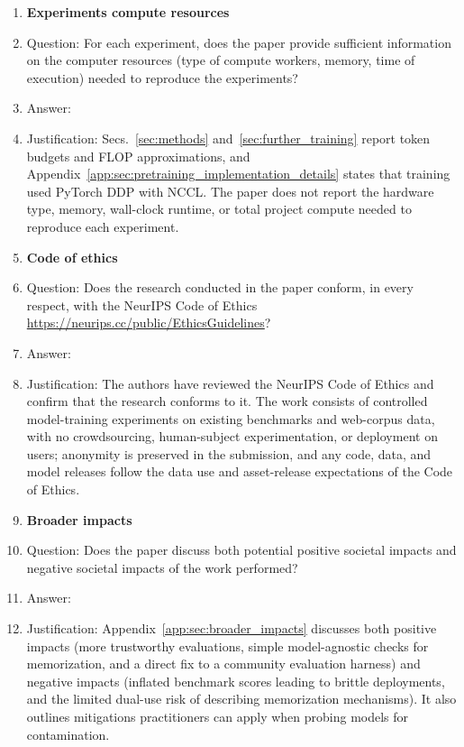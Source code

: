 \begin{enumerate}
\item {\bf Experiments compute resources}
    \item[] Question: For each experiment, does the paper provide sufficient information on the computer resources (type of compute workers, memory, time of execution) needed to reproduce the experiments?
    \item[] Answer: \answerNo{}
    \item[] Justification: Secs.~\ref{sec:methods} and~\ref{sec:further_training} report token budgets and FLOP approximations, and Appendix~\ref{app:sec:pretraining_implementation_details} states that training used PyTorch DDP with NCCL. The paper does not report the hardware type, memory, wall-clock runtime, or total project compute needed to reproduce each experiment.
    
\item {\bf Code of ethics}
    \item[] Question: Does the research conducted in the paper conform, in every respect, with the NeurIPS Code of Ethics \url{https://neurips.cc/public/EthicsGuidelines}?
    \item[] Answer: \answerYes{}
    \item[] Justification: The authors have reviewed the NeurIPS Code of Ethics and confirm that the research conforms to it. The work consists of controlled model-training experiments on existing benchmarks and web-corpus data, with no crowdsourcing, human-subject experimentation, or deployment on users; anonymity is preserved in the submission, and any code, data, and model releases follow the data use and asset-release expectations of the Code of Ethics.


\item {\bf Broader impacts}
    \item[] Question: Does the paper discuss both potential positive societal impacts and negative societal impacts of the work performed?
    \item[] Answer: \answerYes{}
    \item[] Justification: Appendix~\ref{app:sec:broader_impacts} discusses both positive impacts (more trustworthy evaluations, simple model-agnostic checks for memorization, and a direct fix to a community evaluation harness) and negative impacts (inflated benchmark scores leading to brittle deployments, and the limited dual-use risk of describing memorization mechanisms). It also outlines mitigations practitioners can apply when probing models for contamination.
    

\end{enumerate}
